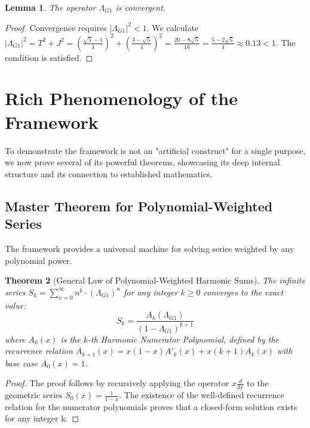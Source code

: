 \documentclass[12pt, letterpaper]{article}
\newtheorem{theorem}{Theorem}[section]
\newtheorem{lemma}[theorem]{Lemma}
\newcommand{\LambdaG}{\Lambda_{G1}}
\begin{document}
\begin{lemma}
The operator $\LambdaG$ is convergent.
\end{lemma}
\begin{proof}
Convergence requires $|\LambdaG|^2 < 1$. We calculate $|\LambdaG|^2 = T^2+J^2 = \left(\frac{\sqrt{5}-1}{4}\right)^2 + \left(\frac{3-\sqrt{5}}{4}\right)^2 = \frac{20-8\sqrt{5}}{16} = \frac{5-2\sqrt{5}}{4} \approx 0.13 < 1$. The condition is satisfied.
\end{proof}


\section{Rich Phenomenology of the Framework}
To demonstrate the framework is not an "artificial construct" for a single purpose, we now prove several of its powerful theorems, showcasing its deep internal structure and its connection to established mathematics.

\subsection{Master Theorem for Polynomial-Weighted Series}
The framework provides a universal machine for solving series weighted by any polynomial power.
\begin{theorem}[General Law of Polynomial-Weighted Harmonic Sums]
The infinite series $S_k = \sum_{n=0}^{\infty} n^k \cdot (\LambdaG)^n$ for any integer $k \ge 0$ converges to the exact value: $$S_k = \frac{A_k(\LambdaG)}{(1-\LambdaG)^{k+1}}$$ where $A_k(x)$ is the $k$-th Harmonic Numerator Polynomial, defined by the recurrence relation $A_{k+1}(x) = x(1-x)A'_k(x) + x(k+1)A_k(x)$ with base case $A_0(x)=1$.
\end{theorem}
\begin{proof}
The proof follows by recursively applying the operator $x \frac{d}{dx}$ to the geometric series $S_0(x) = \frac{1}{1-x}$. The existence of the well-defined recurrence relation for the numerator polynomials proves that a closed-form solution exists for any integer k.
\end{proof}
\end{document}
